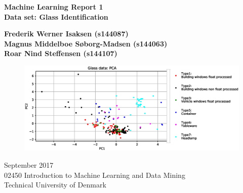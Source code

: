 

\begin{titlepage}
    \begin{center}
        \vspace*{1cm}
        
        \Huge
        \vspace{0.5cm}
        \textbf{Machine Learning Report 1\\
        Data set: Glass Identification}

 
        \vspace{2cm}
        \Large
        \textbf{Frederik Werner Isaksen (s144087) \\
                Magnus Middelboe Søborg-Madsen (s144063) \\
                Roar Nind Steffensen (s144107)} \\
        
        \vspace{2 cm}
        
        \begin{figure}[H]
        \centering
        \includegraphics[width=\textwidth]{fig/PCAStdNormed.eps}
        \end{figure}

        
        \vfill
        \vspace{0.8cm}
        \Large
        September 2017\\
        02450 Introduction to Machine Learning and Data Mining\\
        Technical University of Denmark\\
        \vspace*{0.8cm}
    \end{center}
\end{titlepage}

